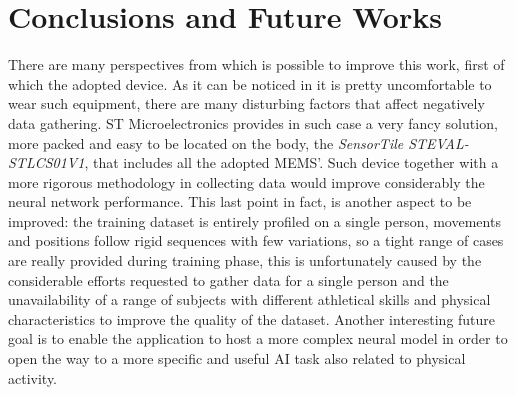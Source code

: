 \section{Conclusions and Future Works}
There are many perspectives from which is possible to improve this work, first of which the adopted device. As it can be noticed in  it is pretty uncomfortable to wear such equipment, there are many disturbing factors that affect negatively data gathering. ST Microelectronics provides in such case a very fancy solution, more packed and easy to be located on the body, the \textit{SensorTile STEVAL-STLCS01V1}, that includes all the adopted MEMS'. Such device together with a more rigorous methodology in collecting data would improve considerably the neural network performance. This last point in fact, is another aspect to be improved:  the training dataset is entirely profiled on a single person, movements and positions follow rigid sequences with few variations, so a tight range of cases are really provided during training phase, this is unfortunately caused by the considerable efforts requested to gather data for a single person and the unavailability of a range of subjects with different athletical skills and physical characteristics to improve the quality of the dataset.\newline
Another interesting future goal is to enable the application to host a more complex neural model in order to open the way to a more specific and useful AI task also related to physical activity. 